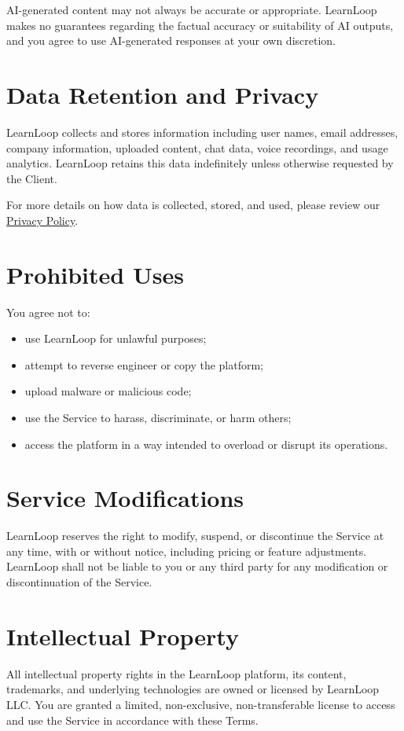 \documentclass[12pt]{article}
\begin{document}
AI-generated content may not always be accurate or appropriate. LearnLoop makes no guarantees regarding the factual accuracy or suitability of AI outputs, and you agree to use AI-generated responses at your own discretion.

\section{Data Retention and Privacy}
LearnLoop collects and stores information including user names, email addresses, company information, uploaded content, chat data, voice recordings, and usage analytics. LearnLoop retains this data indefinitely unless otherwise requested by the Client.

For more details on how data is collected, stored, and used, please review our \href{https://learn-loop.org/privacy}{Privacy Policy}.

\section{Prohibited Uses}
You agree not to:
\begin{itemize}[leftmargin=*]
    \item use LearnLoop for unlawful purposes;
    \item attempt to reverse engineer or copy the platform;
    \item upload malware or malicious code;
    \item use the Service to harass, discriminate, or harm others;
    \item access the platform in a way intended to overload or disrupt its operations.
\end{itemize}

\section{Service Modifications}
LearnLoop reserves the right to modify, suspend, or discontinue the Service at any time, with or without notice, including pricing or feature adjustments. LearnLoop shall not be liable to you or any third party for any modification or discontinuation of the Service.

\section{Intellectual Property}
All intellectual property rights in the LearnLoop platform, its content, trademarks, and underlying technologies are owned or licensed by LearnLoop LLC. You are granted a limited, non-exclusive, non-transferable license to access and use the Service in accordance with these Terms.
\end{document}
